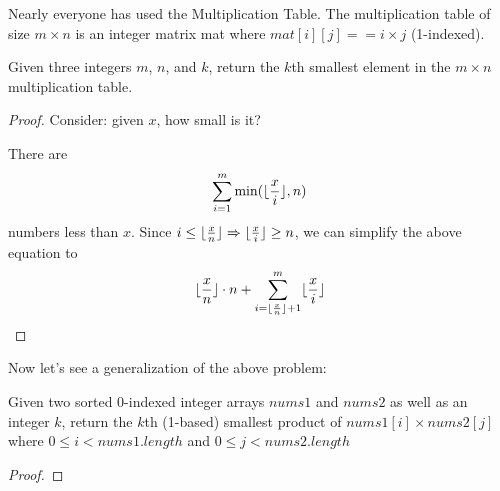 \documentclass[11pt]{article}
\begin{document}
\begin{problem}
Nearly everyone has used the Multiplication Table. The multiplication table of size \(m\times n\) is an
integer matrix mat where \(mat[i][j] == i\times j\) (1-indexed).

Given three integers \(m\), \(n\), and \(k\), return the \(k\)th smallest element in the \(m\times n\) multiplication table.
\end{problem}

\begin{proof}
Consider: given \(x\), how small is it?

There are
\begin{equation*}
\sum_{i=1}^m\min(\lfloor \frac{x}{i} \rfloor,n)
\end{equation*}
numbers less than \(x\). Since \(i\le\lfloor \frac{x}{n} \rfloor\Rightarrow\lfloor \frac{x}{i} \rfloor\ge n\), we can simplify
the above equation to
\begin{equation*}
\lfloor \frac{x}{n} \rfloor\cdot n+\sum_{i=\lfloor \frac{x}{n} \rfloor+1}^m\lfloor \frac{x}{i} \rfloor
\end{equation*}
\end{proof}

Now let's see a generalization of the above problem:

\begin{problem}
Given two sorted 0-indexed integer arrays \(nums1\) and \(nums2\) as well as an integer \(k\), return the
\(k\)th (1-based) smallest product of \(nums1[i]\times nums2[j]\) where \(0\le i < nums1.length\) and
\(0\le j<nums2.length\)
\end{problem}

\begin{proof}

\end{proof}
\end{document}
